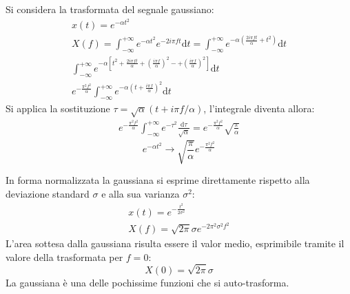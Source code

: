 \documentclass{article}
\newcommand{\df}{\mathrm{d}}
\numberwithin{equation}{subsection}
\begin{document}
Si considera la trasformata del segnale gaussiano:
\begin{gather*}
    x(t)=e^{-\alpha t^2}\\
    X(f)=\displaystyle\int_{-\infty}^{+\infty}e^{-\alpha t^2}e^{-2i\pi ft}\df t=\int_{-\infty}^{+\infty}e^{-\alpha\left(\frac{2i\pi ft}{\alpha} + t^2\right)}\df t\\
    \displaystyle\int_{-\infty}^{+\infty}e^{-\alpha\left[t^2+\frac{2i\pi ft}{\alpha}+\left(\frac{i\pi f}{\alpha}\right)^2-+\left(\frac{i\pi f}{\alpha}\right)^2\right]}\df t\\
    e^{-\frac{\pi^2f^2}{\alpha}}\displaystyle\int_{-\infty}^{+\infty}e^{-\alpha\left(t+\frac{i\pi f}{\alpha}\right)^2}\df t
\end{gather*}
Si applica la sostituzione $\tau=\sqrt{\alpha}(t+i\pi f/\alpha)$, l'integrale diventa allora:
\begin{gather*}
    e^{-\frac{\pi^2f^2}{\alpha}}\displaystyle\int_{-\infty}^{+\infty}e^{-\tau^2}\frac{\df\tau}{\sqrt{\alpha}}=e^{-\frac{\pi^2f^2}{\alpha}}\sqrt{\frac{\pi}{\alpha}}
\end{gather*}
\begin{equation}
    e^{-\alpha t^2}\to \sqrt{\frac{\pi}{\alpha}}e^{-\frac{\pi^2f^2}{\alpha}}
\end{equation}

In forma normalizzata la gaussiana si esprime direttamente rispetto alla deviazione standard $\sigma$ e alla sua varianza $\sigma^2$:
\begin{gather*}
    x(t)=e^{-\frac{t^2}{2\sigma^2}}\\
    X(f)=\sqrt{2\pi}\sigma e^{-2\pi^2\sigma^2f^2}
\end{gather*}
L'area sottesa dalla gaussiana risulta essere il valor medio, esprimibile tramite il valore della trasformata per $f=0$:
\begin{equation*}
    X(0)=\sqrt{2\pi}\sigma
\end{equation*}
La gaussiana è una delle pochissime funzioni che si auto-trasforma. 
\end{document}
